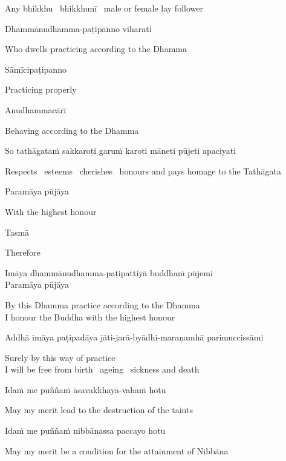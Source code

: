 \begin{english}
  Any bhikkhu \breathmark\ bhikkhunī \breathmark\ male or female lay follower
\end{english}

Dhammānudhamma-paṭipanno viharati

\begin{english}
  Who dwells practicing according to the Dhamma
\end{english}

Sāmīcipaṭipanno

\begin{english}
  Practicing properly
\end{english}

Anudhammacārī

\begin{english}
  Behaving according to the Dhamma
\end{english}

So tathāgataṁ sakkaroti garuṁ karoti māneti pūjeti apaciyati

\begin{english}
  Respects \breathmark\ esteems \breathmark\ cherishes \breathmark\ honours and pays homage to the Tathāgata
\end{english}

Paramāya pūjāya

\begin{english}
  With the highest honour
\end{english}

\suttaRef{[DN 16]}

Tasmā

\begin{english}
  Therefore
\end{english}

Imāya dhammānudhamma-paṭipattiyā buddhaṁ pūjemi\\
Paramāya pūjāya

\begin{english}
  By this Dhamma practice according to the Dhamma\\
  I honour the Buddha with the highest honour
\end{english}

Addhā imāya paṭipadāya jāti-jarā-byādhi-maraṇamhā parimuccissāmi

\begin{english}
  Surely by this way of practice\\
  I will be free from birth \breathmark\ ageing \breathmark\ sickness and death
\end{english}

Idaṁ me puññaṁ āsavakkhayā-vahaṁ hotu

\begin{english}
  May my merit lead to the destruction of the taints
\end{english}

Idaṁ me puññaṁ nibbānassa paccayo hotu

\begin{english}
  May my merit be a condition for the attainment of Nibbāna
\end{english}


